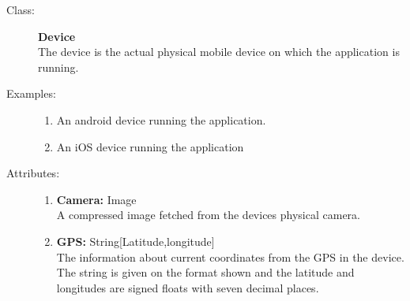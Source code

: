 \documentclass[10pt,a4paper]{article}
\begin{document}
%
%
%

\begin{description}
\item[Class:] \textbf{Device} \hfill \\
The device is the actual physical mobile device on which the application is running.

\item[Examples:] \hfill
\begin{enumerate}
\item An android device running the application.
\item An iOS device running the application
\end{enumerate}

\item[Attributes:] \hfill
\begin{enumerate}
\item \textbf{Camera:} Image \hfill \\A compressed image fetched from the devices physical camera.
\item \textbf{GPS:} String[Latitude,longitude] \hfill \\The information about current coordinates from the GPS in the device. The string is given on the format shown and the latitude and longitudes are signed floats with seven decimal places.
\end{enumerate}
\end{description}

\hrulefill
\end{document}
